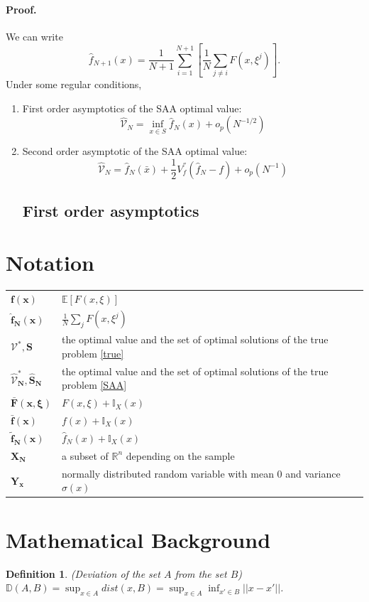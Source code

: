 \documentclass[a4pper,11pt]{article}
\newcommand{\be}{\mathbb E}
\newtheorem{defn}[thm]{Definition}
\begin{document}
\paragraph{Proof.} We can write 
$$
\hat f_{N+1}(x)=\frac{1}{N+1}\sum_{i=1}^{N+1}[\frac{1}{N}\sum_{j\ne i}F(x,\xi^j)].
$$
Under some regular conditions,
\begin{enumerate}
	\item First order asymptotics of the SAA optimal value:
	$$
	\hat {\mathcal V}_N = \inf_{x\in S}\hat f_N(x)+o_p(N^{-1/2})
	$$
	\item Second order asymptotic of the SAA optimal value:
	$$
	\hat {\mathcal V}_N = \hat f_N(\bar x)+\frac{1}{2}V^{''}_f(\hat f_N-f)+o_p(N^{-1})
	$$
\subsection{First order asymptotics}
\end{enumerate}




\section{Notation}
\begin{table}[!h]
\begin{tabular}{ll}
$\bm{f(x)}$ & $\be [F(x,\xi)]$\\
$\bm{\hat f_N(x)}$&$ \frac{1}{N}\sum_{j}F(x,\xi^j)$\\
$\bm{\mathcal V^*, S}$& the optimal value and the set of optimal solutions of the true problem \eqref{true}\\
$\bm{\hat{\mathcal V}^*_N, \hat S_N}$& the optimal value and the set of optimal solutions of the true problem \eqref{SAA}\\
$\bm{\bar{F}(x,\xi)}$&$  F(x,\xi)+\mathbb I_X(x)$\\
$\bm{\bar f(x)}$&$  f(x)+\mathbb I_X(x)$\\
$\bm{\tilde f_N(x)}$&$ \hat f_N(x)+\mathbb I_X(x)$\\
$\bm{X_N}$& a subset of $\mathbb R^n$ depending on the sample\\
$\bm{Y_x}$& normally distributed random variable with mean $0$ and variance $\sigma(x)$\\
\end{tabular}
\end{table}
\section{Mathematical Background}
 \begin{defn}
(Deviation of the set $A$ from the set $B$) $ \mathbb D(A,B) = \sup_{x\in A}dist(x,B) = \sup_{x\in A} \inf_{x'\in B}||x-x'||$.
 \end{defn}
 
\end{document}
